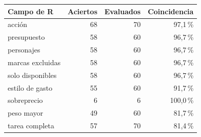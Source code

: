 \begin{tabular}{@{}lrrr@{}}\toprule
Campo de R & Aciertos & Evaluados & Coincidencia\\\midrule
acción & 68 & 70 & 97,1\,\%\\
presupuesto & 58 & 60 & 96,7\,\%\\
personajes & 58 & 60 & 96,7\,\%\\
marcas excluidas & 58 & 60 & 96,7\,\%\\
solo disponibles & 58 & 60 & 96,7\,\%\\
estilo de gasto & 55 & 60 & 91,7\,\%\\
sobreprecio & 6 & 6 & 100,0\,\%\\
peso mayor & 49 & 60 & 81,7\,\%\\
tarea completa & 57 & 70 & 81,4\,\%\\
\bottomrule\end{tabular}
